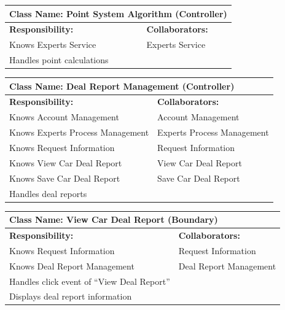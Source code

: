 \documentclass[]{article}
\begin{document}
\begin{table}[H]
  \centering
  \renewcommand{\arraystretch}{1.3} %
  \begin{tabular}{|p{7.5cm}|p{7.5cm}|}
    \hline
    \multicolumn{2}{|l|}{\textbf{Class Name: Point System Algorithm (Controller)}} \\
    \hline
    \textbf{Responsibility:}   & \textbf{Collaborators:}                           \\
    \hline
    Knows Experts Service      & Experts Service                                   \\
    Handles point calculations &                                                   \\
    \hline
  \end{tabular}
\end{table}
\begin{table}[H]
  \centering
  \renewcommand{\arraystretch}{1.3} %
  \begin{tabular}{|p{7.5cm}|p{7.5cm}|}
    \hline
    \multicolumn{2}{|l|}{\textbf{Class Name: Deal Report Management (Controller)}} \\
    \hline
    \textbf{Responsibility:}         & \textbf{Collaborators:}                     \\
    \hline
    Knows Account Management         & Account Management                          \\
    Knows Experts Process Management & Experts Process Management                  \\
    Knows Request Information        & Request Information                         \\
    Knows View Car Deal Report       & View Car Deal Report                        \\
    Knows Save Car Deal Report       & Save Car Deal Report                        \\
    Handles deal reports             &                                             \\
    \hline
  \end{tabular}
\end{table}
\begin{table}[H]
  \centering
  \renewcommand{\arraystretch}{1.3} %
  \begin{tabular}{|p{7.5cm}|p{7.5cm}|}
    \hline
    \multicolumn{2}{|l|}{\textbf{Class Name: View Car Deal Report (Boundary)}} \\
    \hline
    \textbf{Responsibility:}                  & \textbf{Collaborators:}        \\
    \hline
    Knows Request Information                 & Request Information            \\
    Knows Deal Report Management              & Deal Report Management         \\
    Handles click event of “View Deal Report” &                                \\
    Displays deal report information          &                                \\
    \hline
  \end{tabular}
\end{table}
\end{document}
